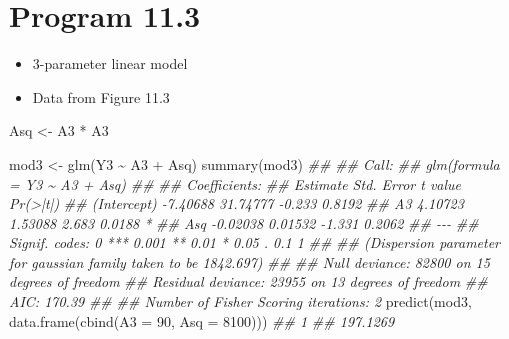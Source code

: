 \documentclass[
  10pt,
  a4paper,
]{book}
\newenvironment{Shaded}{\begin{snugshade}}{\end{snugshade}}
\newcommand{\AttributeTok}[1]{\textcolor[rgb]{0.40,0.45,0.13}{#1}}
\newcommand{\DecValTok}[1]{\textcolor[rgb]{0.68,0.00,0.00}{#1}}
\newcommand{\DocumentationTok}[1]{\textcolor[rgb]{0.37,0.37,0.37}{\textit{#1}}}
\newcommand{\FunctionTok}[1]{\textcolor[rgb]{0.28,0.35,0.67}{#1}}
\newcommand{\NormalTok}[1]{\textcolor[rgb]{0.00,0.46,0.62}{#1}}
\newcommand{\OtherTok}[1]{\textcolor[rgb]{0.00,0.46,0.62}{#1}}
\newcommand{\SpecialCharTok}[1]{\textcolor[rgb]{0.37,0.37,0.37}{#1}}
\providecommand{\tightlist}{%
  \setlength{\itemsep}{0pt}\setlength{\parskip}{0pt}}
\begin{document}
\hypertarget{program-11.3}{%
\section{Program 11.3}\label{program-11.3}}

\begin{itemize}
\tightlist
\item
  3-parameter linear model
\item
  Data from Figure 11.3
\end{itemize}

\begin{Shaded}
\begin{Highlighting}[]
\NormalTok{Asq }\OtherTok{\textless{}{-}}\NormalTok{ A3 }\SpecialCharTok{*}\NormalTok{ A3}

\NormalTok{mod3 }\OtherTok{\textless{}{-}} \FunctionTok{glm}\NormalTok{(Y3 }\SpecialCharTok{\textasciitilde{}}\NormalTok{ A3 }\SpecialCharTok{+}\NormalTok{ Asq)}
\FunctionTok{summary}\NormalTok{(mod3)}
\DocumentationTok{\#\# }
\DocumentationTok{\#\# Call:}
\DocumentationTok{\#\# glm(formula = Y3 \textasciitilde{} A3 + Asq)}
\DocumentationTok{\#\# }
\DocumentationTok{\#\# Coefficients:}
\DocumentationTok{\#\#             Estimate Std. Error t value Pr(\textgreater{}|t|)  }
\DocumentationTok{\#\# (Intercept) {-}7.40688   31.74777  {-}0.233   0.8192  }
\DocumentationTok{\#\# A3           4.10723    1.53088   2.683   0.0188 *}
\DocumentationTok{\#\# Asq         {-}0.02038    0.01532  {-}1.331   0.2062  }
\DocumentationTok{\#\# {-}{-}{-}}
\DocumentationTok{\#\# Signif. codes:  0 \textquotesingle{}***\textquotesingle{} 0.001 \textquotesingle{}**\textquotesingle{} 0.01 \textquotesingle{}*\textquotesingle{} 0.05 \textquotesingle{}.\textquotesingle{} 0.1 \textquotesingle{} \textquotesingle{} 1}
\DocumentationTok{\#\# }
\DocumentationTok{\#\# (Dispersion parameter for gaussian family taken to be 1842.697)}
\DocumentationTok{\#\# }
\DocumentationTok{\#\#     Null deviance: 82800  on 15  degrees of freedom}
\DocumentationTok{\#\# Residual deviance: 23955  on 13  degrees of freedom}
\DocumentationTok{\#\# AIC: 170.39}
\DocumentationTok{\#\# }
\DocumentationTok{\#\# Number of Fisher Scoring iterations: 2}
\FunctionTok{predict}\NormalTok{(mod3, }\FunctionTok{data.frame}\NormalTok{(}\FunctionTok{cbind}\NormalTok{(}\AttributeTok{A3 =} \DecValTok{90}\NormalTok{, }\AttributeTok{Asq =} \DecValTok{8100}\NormalTok{)))}
\DocumentationTok{\#\#        1 }
\DocumentationTok{\#\# 197.1269}
\end{Highlighting}
\end{Shaded}
\end{document}
